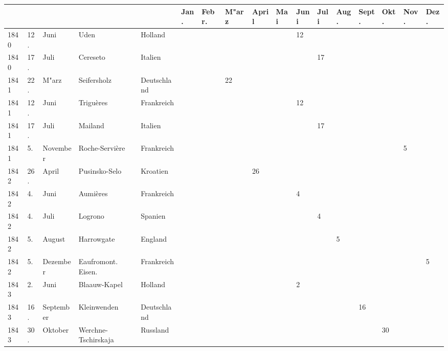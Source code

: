 \documentclass[a4paper, 8pt, oneside, polutonikogreek, german]{article}
\begin{document}
\begin{landscape}
\vspace*{\fill}
\begin{table}[H]
    \footnotesize
    \centering
    \begin{longtable}{|p{5mm}|p{4mm}|p{13mm}|p{23mm}|p{16mm}|p{4mm}|p{6mm}|p{6mm}|p{6mm}|p{4mm}|p{5mm}|p{4mm}|p{5mm}|p{6mm}|p{5mm}|p{5mm}|p{5mm}|}
    \hline
         &  &  &  &  & Jan. & Febr. & M"arz & April & Mai & Juni & Juli & Aug. & Sept. & Okt. & Nov. & Dez. \\ \hline
        1840 & 12. & Juni & Uden & Holland & ~ & ~ & ~ & ~ & ~ & 12 & ~ & ~ & ~ & ~ & ~ & ~ \\ \hline
        1840 & 17. & Juli & Cereseto & Italien & ~ & ~ & ~ & ~ & ~ & ~ & 17 & ~ & ~ & ~ & ~ & ~ \\ \hline
        1841 & 22. & M"arz & Seifersholz & Deutschland & ~ & ~ & 22 & ~ & ~ & ~ & ~ & ~ & ~ & ~ & ~ & ~ \\ \hline
        1841 & 12. & Juni & Triguères & Frankreich & ~ & ~ & ~ & ~ & ~ & 12 & ~ & ~ & ~ & ~ & ~ & ~ \\ \hline
        1841 & 17. & Juli & Mailand & Italien & ~ & ~ & ~ & ~ & ~ & ~ & 17 & ~ & ~ & ~ & ~ & ~ \\ \hline
        1841 & 5. & November & Roche-Servière & Frankreich & ~ & ~ & ~ & ~ & ~ & ~ & ~ & ~ & ~ & ~ & 5 & ~ \\ \hline
        1842 & 26. & April & Pusinsko-Selo & Kroatien & ~ & ~ & ~ & 26 & ~ & ~ & ~ & ~ & ~ & ~ & ~ & ~ \\ \hline
        1842 & 4. & Juni & Aumières & Frankreich & ~ & ~ & ~ & ~ & ~ & 4 & ~ & ~ & ~ & ~ & ~ & ~ \\ \hline
        1842 & 4. & Juli & Logrono & Spanien & ~ & ~ & ~ & ~ & ~ & ~ & 4 & ~ & ~ & ~ & ~ & ~ \\ \hline
        1842 & 5. & August & Harrowgate & England & ~ & ~ & ~ & ~ & ~ & ~ & ~ & 5 & ~ & ~ & ~ & ~ \\ \hline
        1842 & 5. & Dezember & Eaufromont. Eisen. & Frankreich & ~ & ~ & ~ & ~ & ~ & ~ & ~ & ~ & ~ & ~ & ~ & 5 \\ \hline
        1843 & 2. & Juni & Blaauw-Kapel & Holland & ~ & ~ & ~ & ~ & ~ & 2 & ~ & ~ & ~ & ~ & ~ & ~ \\ \hline
        1843 & 16. & September & Kleinwenden & Deutschland & ~ & ~ & ~ & ~ & ~ & ~ & ~ & ~ & 16 & ~ & ~ & ~ \\ \hline
        1843 & 30. & Oktober & Werchne-Tschirskaja & Russland & ~ & ~ & ~ & ~ & ~ & ~ & ~ & ~ & ~ & 30 & ~ & ~ \\ \hline

\end{longtable}
\end{table}
\end{landscape}
\end{document}
